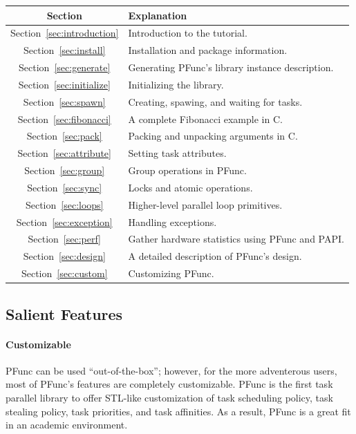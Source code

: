 \begin{center}
\begin{tabular}{|c|l|}
\hline
Section & Explanation \\
\hline
Section~\ref{sec:introduction} & Introduction to the tutorial.\\
\hline
Section~\ref{sec:install} & Installation and package information.\\
\hline
Section~\ref{sec:generate} & Generating PFunc's library instance description.\\
\hline
Section~\ref{sec:initialize} & Initializing the library.\\
\hline
Section~\ref{sec:spawn} & Creating, spawing, and waiting for tasks.\\
\hline
Section~\ref{sec:fibonacci} & A complete Fibonacci example in C. \\
\hline
Section~\ref{sec:pack} & Packing and unpacking arguments in C. \\
\hline
Section~\ref{sec:attribute} & Setting task attributes. \\
\hline
Section~\ref{sec:group} & Group operations in PFunc.\\
\hline
Section~\ref{sec:sync} & Locks and atomic operations.\\
\hline
Section~\ref{sec:loops} & Higher-level parallel loop primitives.\\
\hline
Section~\ref{sec:exception} & Handling exceptions.\\
\hline
Section~\ref{sec:perf} & Gather hardware statistics using PFunc and PAPI.\\
\hline
Section~\ref{sec:design} & A detailed description of PFunc's design.\\
\hline
Section~\ref{sec:custom} & Customizing PFunc. \\
\hline
\end{tabular}
\end{center}

\subsection{Salient Features}
\label{subsec:salient}
%
\paragraph{Customizable}
%
PFunc can be used ``out-of-the-box''; however, for the more adventerous users,
most of PFunc's features are completely customizable.
%
PFunc is the first task parallel library to offer STL-like customization of
task scheduling policy, task stealing policy, task priorities, and task
affinities.
%
As a result, PFunc is a great fit in an academic environment.

